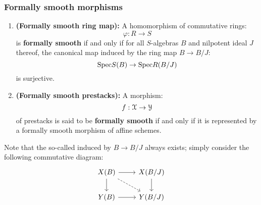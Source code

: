         \subsubsection{Formally smooth morphisms}
            \begin{definition} \label{def: formal_smoothness} 
                \noindent
                \begin{enumerate}
                    \item \textbf{(Formally smooth ring map):} A homomorphism of commutative rings:
                        $$\varphi: R \to S$$
                    is \textbf{formally smooth} if and only if for all $S$-algebras $B$ and nilpotent ideal $J$ thereof, the canonical map induced by the ring map $B \to B/J$:
                        $$\mathrm{Spec} S(B) \to \mathrm{Spec} R(B/J)$$
                    is surjective.
                    \item \textbf{(Formally smooth prestacks):} A morphism:
                        $$f: \mathcal{X} \to \mathcal{Y}$$
                    of prestacks is said to be \textbf{formally smooth} if and only if it is represented by a formally smooth morphism of affine schemes.
                \end{enumerate}
            \end{definition}
            \begin{remark}
                Note that the so-called  induced by $B \to B/J$ always exists; simply consider the following commutative diagram:
                    $$
                        \begin{tikzcd}
                        	{X(B)} & {X(B/J)} \\
                        	{Y(B)} & {Y(B/J)}
                        	\arrow[from=1-1, to=2-1]
                        	\arrow[from=2-1, to=2-2]
                        	\arrow[from=1-1, to=1-2]
                        	\arrow[from=1-2, to=2-2]
                        	\arrow[dashed, from=1-1, to=2-2]
                        \end{tikzcd}
                    $$
            \end{remark}
            
